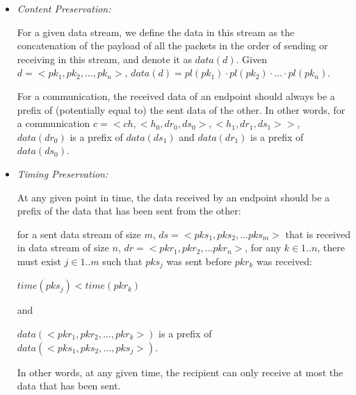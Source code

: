 \documentclass[12pt,oneside]{book}
\begin{document}
\begin{itemize}
 \item \textit{Content Preservation:} 

 For a given data stream, we define the data in this stream as the concatenation of the payload of all the packets in the order of sending or receiving in this stream, and denote it as $data(d)$. Given $ d=<pk_1, pk_2, ..., pk_n>$, $data(d)=pl(pk_1) \cdot pl(pk_2)\cdot \ldots \cdot pl(pk_n)$.

 For a communication, the received data of an endpoint should always be a prefix of (potentially equal to) the sent data of the other. In other words, for a communication $c = <ch, <h_0, dr_0, ds_0>, <h_1, dr_1, ds_1>>$, $data(dr_0)$ is a prefix of $data(ds_1)$ and $data(dr_1)$ is a prefix of $data(ds_0)$.

\item \textit{Timing Preservation:} 

At any given point in time, the data received by an endpoint should be a prefix of the data that has been sent from the other:

for a sent data stream of size $m$, $ds= <pks_1, pks_2, ... pks_m>$ that is received in data stream of size $n$, $dr = <pkr_1, pkr_2, ... pkr_n>$, for any $k \in {1..n}$, there must exist $j \in {1..m}$ such that $pks_j$ was sent before $pkr_k$ was received:

$time(pks_j) < time(pkr_k)$

and

$ data(<pkr_1, pkr_2, ..., pkr_k>)$ is a prefix of $data(<pks_1, pks_2, ..., pks_j>)$.

In other words, at any given time, the recipient can only receive at most the data that has been sent.

\end{itemize}
\end{document}
